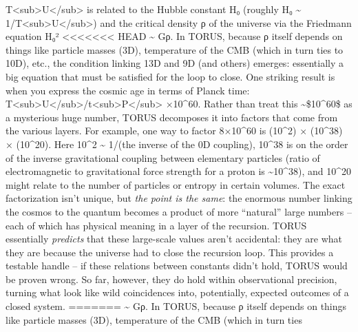 \documentclass[]{article}
\begin{document}
{\begin{itemize}
  T\textless{}sub\textgreater{}U\textless{}/sub\textgreater{} is related
  to the Hubble constant H₀ (roughly H₀ \textasciitilde{}
  1/T\textless{}sub\textgreater{}U\textless{}/sub\textgreater{}) and the
  critical density ρ of the universe via the Friedmann equation H₀²
<<<<<<< HEAD
  \textasciitilde{} Gρ\hspace{0pt}. In TORUS, because ρ itself depends
  on things like particle masses (3D), temperature of the CMB (which in
  turn ties to 10D), etc., the condition linking 13D and 9D (and others)
  emerges: essentially a big equation that must be satisfied for the
  loop to close. One striking result is when you express the cosmic age
  in terms of Planck time:
  T\textless sub\textgreater U\textless/sub\textgreater/t\textless sub\textgreater P\textless/sub\textgreater{}
  ×10\^{}60\hspace{0pt}. Rather than treat this
  \textasciitilde\$10\^{}60\$ as a mysterious huge number, TORUS
  decomposes it into factors that come from the various
  layers\hspace{0pt}. For example, one way to factor 8×10\^{}60 is
  (10\^{}2) × (10\^{}38) × (10\^{}20)\hspace{0pt}. Here 10\^{}2
  \textasciitilde{} 1/\alpha (the inverse of the 0D coupling), 10\^{}38 is on
  the order of the inverse gravitational coupling between elementary
  particles (ratio of electromagnetic to gravitational force strength
  for a proton is \textasciitilde10\^{}38), and 10\^{}20 might relate to
  the number of particles or entropy in certain volumes\hspace{0pt}. The
  exact factorization isn't unique, but \emph{the point is the same}:
  the enormous number linking the cosmos to the quantum becomes a
  product of more ``natural'' large numbers -- each of which has
  physical meaning in a layer of the recursion\hspace{0pt}. TORUS
  essentially \emph{predicts} that these large-scale values aren't
  accidental: they are what they are because the universe had to close
  the recursion loop. This provides a testable handle -- if these
  relations between constants didn't hold, TORUS would be proven
  wrong\hspace{0pt}. So far, however, they do hold within observational
  precision, turning what look like wild coincidences into, potentially,
  expected outcomes of a closed system.
=======
  \textasciitilde{} Gρ​. In TORUS, because ρ itself depends on things
  like particle masses (3D), temperature of the CMB (which in turn ties

\end{itemize}}
\end{document}
